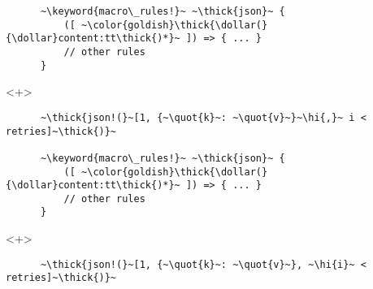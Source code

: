 \documentclass[usepdftitle=false]{beamer}
\newcommand{\dollar}{\makebox[\widthof{\$}][c]{\$}}
\newcommand{\thick}[1]{\contourlength{0.16pt}\contour[10]{black}{#1}}
\newcommand{\slantbox}[2][.5]
  {%
    \mbox
      {%
        \sbox{\foobox}{#2}%
        \hskip\wd\foobox
        \pdfsave
        \pdfsetmatrix{1 0 #1 1}%
        \llap{\usebox{\foobox}}%
        \pdfrestore
      }%
  }
\newcommand{\backslantbox}[2][.5]
  {%
    \mbox
      {%
        \sbox{\foobox}{#2}%
        \hskip\wd\foobox
        \pdfsave
        \pdfsetmatrix{-1 0 #1 1}%
        \llap{\usebox{\foobox}}%
        \pdfrestore
      }%
  }
\newcommand{\hi}[1]{%
\tikz[baseline=(A.base)]
 \node[highlighting=yellowbg,inner sep=0pt,text depth=0pt] (A) {#1};%
}
\newcommand{\openquote}{\backslantbox[.2]{\hspace{11pt}''\hspace{-11pt}}}
\newcommand{\closequote}{\slantbox[-.2]{\hspace{2pt}''\hspace{-2pt}}}
\newcommand{\blackquote}[1]{\openquote#1\closequote}
\newcommand{\quot}[1]{{\color{redish}\blackquote{#1}}}
\newcommand{\keyword}[1]{\color{greenish}#1}
\begin{document}
\begin{frame}[fragile]
\begin{onlyenv}
\begin{verbatim}
      ~\keyword{macro\_rules!}~ ~\thick{json}~ {
          ([ ~\color{goldish}\thick{\dollar(}{\dollar}content:tt\thick{)*}~ ]) => { ... }
          // other rules
      }
    \end{verbatim}
  \end{onlyenv}
  \begin{onlyenv}<+>
    \vspace{-20.5pt}
    \begin{verbatim}
      ~\thick{json!(}~[1, {~\quot{k}~: ~\quot{v}~}~\hi{,}~ i < retries]~\thick{)}~

      ~\keyword{macro\_rules!}~ ~\thick{json}~ {
          ([ ~\color{goldish}\thick{\dollar(}{\dollar}content:tt\thick{)*}~ ]) => { ... }
          // other rules
      }
    \end{verbatim}
  \end{onlyenv}
  \begin{onlyenv}<+>
    \vspace{-20.5pt}
    \begin{verbatim}
      ~\thick{json!(}~[1, {~\quot{k}~: ~\quot{v}~}, ~\hi{i}~ < retries]~\thick{)}~


\end{verbatim}
\end{onlyenv}
\end{frame}
\end{document}
